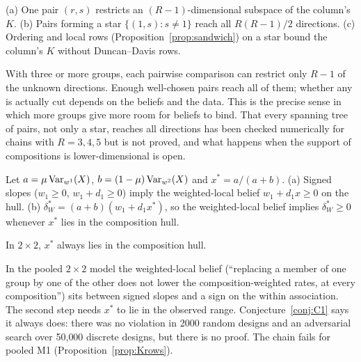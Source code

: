 \begin{proposition}\label{prop:rank}
(a) One pair $(r,s)$ restricts an $(R-1)$-dimensional subspace of the column's
$K$. (b) Pairs forming a star $\{(1,s):s\ne1\}$ reach all $R(R-1)/2$ directions.
(c) Ordering and local rows (Proposition~\ref{prop:sandwich}) on a star bound the
column's $K$ without Duncan--Davis rows.
\end{proposition}
\begin{reading}
With three or more groups, each pairwise comparison can restrict only $R-1$ of
the unknown directions. Enough well-chosen pairs reach all of them; whether any
is actually cut depends on the beliefs and the data. This is the precise sense in
which more groups give more room for beliefs to bind. That every spanning tree of
pairs, not only a star, reaches all directions has been checked numerically for
chains with $R=3,4,5$ but is not proved, and what happens when the support of
compositions is lower-dimensional is open.
\end{reading}

\begin{proposition}\label{prop:PN}
Let $a=\mu\operatorname{Var}_{w^1}(X)$, $b=(1-\mu)\operatorname{Var}_{w^2}(X)$ and $x^*=a/(a+b)$. (a) Signed
slopes ($w_1\ge0$, $w_1+d_1\ge0$) imply the weighted-local belief $w_1+d_1x\ge0$ on
the hull. (b) $\delta^*_W=(a+b)(w_1+d_1x^*)$, so the weighted-local belief implies
$\delta^*_W\ge0$ whenever $x^*$ lies in the composition hull.
\end{proposition}

\begin{conjecture}\label{conj:C1}
In $2\times2$, $x^*$ always lies in the composition hull.
\end{conjecture}
\begin{reading}
In the pooled $2\times2$ model the weighted-local belief (``replacing a member of
one group by one of the other does not lower the composition-weighted rates, at
every composition'') sits between signed slopes and a sign on the within
association. The second step needs $x^*$ to lie in the observed range.
Conjecture~\ref{conj:C1} says it always does: there was no violation in 2000
random designs and an adversarial search over 50{,}000 discrete designs, but there
is no proof. The chain fails for pooled M1 (Proposition~\ref{prop:Krows}).
\end{reading}


